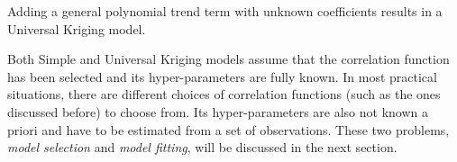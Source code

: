 Adding a general polynomial trend term with unknown coefficients results in a Universal Kriging model.


Both Simple and Universal Kriging models assume that the correlation function has been selected and its hyper-parameters are fully known.
In most practical situations, there are different choices of correlation functions (such as the ones discussed before) to choose from.
Its hyper-parameters are also not known a priori and have to be estimated from a set of observations.
These two problems, \emph{model selection} and \emph{model fitting}, will be discussed in the next section. 
